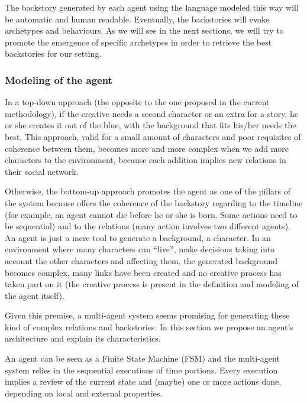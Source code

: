 \documentclass{sig-alternate}
\begin{document}
The backstory generated by each agent using the language modeled this way will be automatic and human readable. Eventually, the backstories will evoke archetypes and behaviours. As we will see in the next sections, we will try to promote the emergence of specific archetypes in order to retrieve the best backstories for our setting.



\subsubsection{Modeling of the agent}


In a top-down approach (the opposite to the one proposed in the current methodology), if the creative needs a second character or an extra for a story, he or she creates it out of the blue, with the background that fits his/her needs the best. This approach, valid for a small amount of characters and poor requisites of coherence between them, becomes more and more complex when we add more characters to the environment, because each addition implies new relations in their social network.


Otherwise, the bottom-up approach promotes the agent as one of the pillars of the system because offers the coherence of the backstory regarding to the timeline (for example, an agent cannot die before he or she is born. Some actions need to be sequential) and to the relations (many action involves two different agents). An agent is just a mere tool to generate a background, a character. In an environment where many characters can ``live'', make decisions taking into account the other characters and affecting them, the generated background becomes complex, many links have been created and no creative process has taken part on it (the creative process is present in the definition and modeling of the agent itself).

Given this premise, a multi-agent system seems promising for generating these kind of complex relations and backstories. In this section we propose an agent's architecture and explain its characteristics.



An agent can be seen as a Finite State Machine (FSM) and the multi-agent system relies in the sequential executions of time portions. Every execution implies a review of the current state and (maybe) one or more actions done, depending on local and external properties.\\
\end{document}
